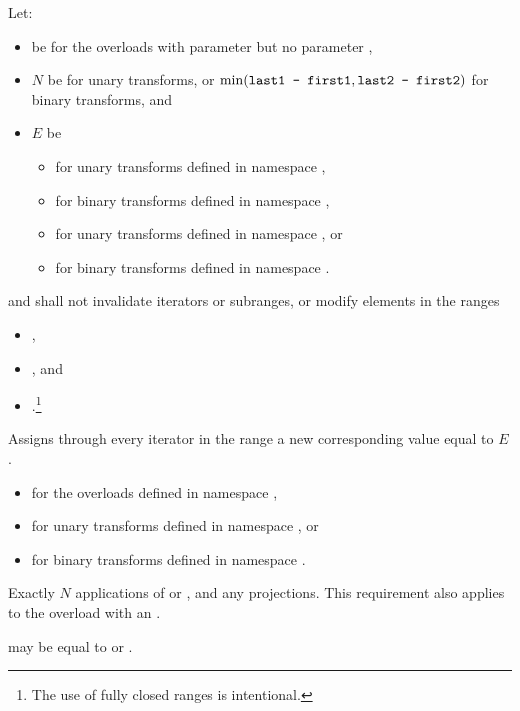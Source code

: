 \begin{itemdescr}
\pnum
Let:
\begin{itemize}
\item {} be  for the overloads with
  parameter  but no parameter ,
\item $N$ be  for unary transforms, or
  $\min(\texttt{last1 - first1}, \texttt{last2 - first2})$ for binary transforms, and
\item $E$ be
  \begin{itemize}
  \item {} for unary transforms defined in
    namespace ,
  \item {} for
    binary transforms defined in namespace ,
  \item {} for unary
    transforms defined in namespace , or
  \item {}
    for binary transforms defined in namespace .
  \end{itemize}
\end{itemize}

\pnum
\requires
{} and 
shall not invalidate iterators or subranges, or modify elements in the ranges
\begin{itemize}
\item {},
\item {}, and
\item {}.\footnote{The use of fully
closed ranges is intentional.}
\end{itemize}

\pnum
\effects
Assigns through every iterator
in the range
a new
corresponding value equal to $E$.

\pnum
\returns
\begin{itemize}
\item {}
  for the overloads defined in namespace ,
\item {} for unary transforms
  defined in namespace , or
\item {} for binary
  transforms defined in namespace .
\end{itemize}

\pnum
\complexity
Exactly $N$ applications of
 or , and any projections.
This requirement also applies to the overload
with an  .

\pnum
\remarks
{} may be equal to  or .
\end{itemdescr}

